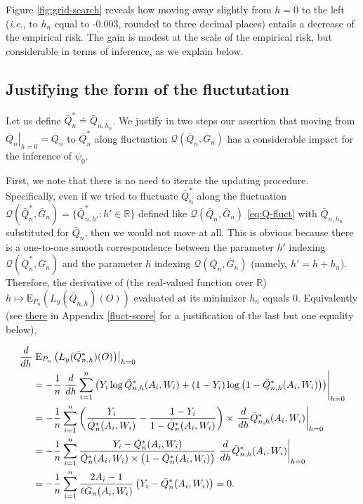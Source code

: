 \documentclass[
  11pt,
  openright,twoside]{book}
\newcommand{\bbR}{\mathbb{R}}
\newcommand{\defq}{\doteq}
\newcommand{\calQ}{\mathcal{Q}}
\newcommand{\Exp}{\textrm{E}}
\newcommand{\Gbar}{\bar{G}}
\newcommand{\Qbar}{\bar{Q}}
\theoremstyle{definition}
\theoremstyle{definition}
\theoremstyle{definition}
\theoremstyle{definition}
\theoremstyle{remark}
\begin{document}
Figure \ref{fig:grid-search} reveals how moving away slightly from \(h=0\) to
the left (\emph{i.e.}, to \(h_{n}\) equal to -0.003,
rounded to three decimal places) entails a decrease of the empirical risk. The
gain is modest at the scale of the empirical risk, but considerable in terms
of inference, as we explain below.

\hypertarget{fluct-justification}{%
\subsection{Justifying the form of the fluctutation}\label{fluct-justification}}

Let us define \(\Qbar_{n}^{*} \defq \Qbar_{n, h_{n}}\). We justify in two
steps our assertion that moving from \(\left.\Qbar_{n}\right|_{h=0} = \Qbar_{n}\) to \(\Qbar_{n}^{*}\) along fluctuation \(\calQ(\Qbar_{n}, \Gbar_{n})\)
has a considerable impact for the inference of \(\psi_{0}\).

First, we note that there is no need to iterate the updating procedure.
Specifically, even if we tried to fluctuate \(\Qbar_{n}^{*}\) along the
fluctuation \(\calQ(\Qbar_{n}^{*}, \Gbar_{n}) = \{\Qbar_{n,h'}^{*} : h' \in \bbR\}\) defined like \(\calQ(\Qbar_{n}, \Gbar_{n})\) \eqref{eq:Q-fluct} with
\(\Qbar_{n,h_{n}}\) substituted for \(\Qbar_{n}\), then we would not move at all.
This is obvious because there is a one-to-one smooth correspondence between
the parameter \(h'\) indexing \(\calQ(\Qbar_{n}^{*}, \Gbar_{n})\) and the
parameter \(h\) indexing \(\calQ(\Qbar_{n}, \Gbar_{n})\) (namely, \(h' = h + h_{n}\)). Therefore, the derivative of (the real-valued function over \(\bbR\))
\(h \mapsto \Exp_{P_n} \left(L_{y} (\Qbar_{n,h})(O)\right)\) evaluated at its
minimizer \(h_{n}\) equals 0. Equivalently (see \protect\hyperlink{fluct-score}{there} in
Appendix \ref{fluct-score} for a justification of the last but one equality
below),

\begin{align}\notag     \frac{d}{d      h}     &      \left.      \Exp_{P_{n}}
\left(L_{y}(\Qbar_{n,h}^{*})(O)\right)\right|_{h=0}      \\     \notag      &=
-\frac{1}{n}\left.\frac{d}{d     h}     \sum_{i=1}^{n}    \left(Y_{i}     \log
\Qbar_{n,h}^{*}(A_{i},    W_{i})    +    (1    -    Y_{i})    \log\left(1    -
\Qbar_{n,h}^{*}(A_{i}, W_{i})\right)\right)\right|_{h=0} \\ \notag &= -\frac{1}{n}\sum_{i=1}^{n} \left(\frac{Y_{i}}{\Qbar_{n}^{*}(A_{i}, W_{i})} - \frac{1 - Y_{i}}{1 - \Qbar_{n}^{*}(A_{i}, W_{i})}\right) \times \left.\frac{d}{d h} \Qbar_{n,h}^{*}(A_{i}, W_{i})\right|_{h=0} \\ \notag&= -\frac{1}{n}\sum_{i=1}^{n} \frac{Y_{i} - \Qbar_{n}^{*}(A_{i}, W_{i})}{\Qbar_{n}^{*}(A_{i}, W_{i}) \times \left(1 - \Qbar_{n}^{*}(A_{i}, W_{i})\right)} \left.\frac{d}{d h} \Qbar_{n,h}^{*}(A_{i}, W_{i})\right|_{h=0}  \\ &= -\frac{1}{n}\sum_{i=1}^{n} \frac{2A_{i} - 1}{\ell\Gbar_{n}(A_{i}, W_{i})} \left(Y_{i} - \Qbar_{n}^{*}(A_{i}, W_{i})\right) = 0. \label{eq:fluct-score}\end{align}
\end{document}
